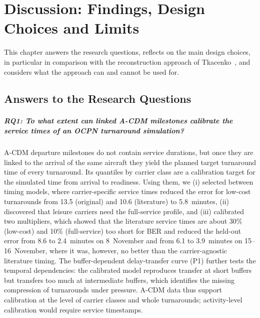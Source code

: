 \chapter{Discussion: Findings, Design Choices and Limits}
\label{ch:discussion}

This chapter answers the research questions, reflects on the main design choices, in particular in comparison with the reconstruction approach of Tkacenko~\cite{tkacenko2026}, and considers what the approach can and cannot be used for.

\section{Answers to the Research Questions}

\paragraph{RQ1: To what extent can linked A-CDM milestones calibrate the service times of an OCPN turnaround simulation?}
A-CDM departure milestones do not contain service durations, but once they are linked to the arrival of the same aircraft they yield the planned target turnaround time of every turnaround. Its quantiles by carrier class are a calibration target for the simulated time from arrival to readiness. Using them, we (i) selected between timing models, where carrier-specific service times reduced the error for low-cost turnarounds from 13.5 (original) and 10.6 (literature) to 5.8~minutes, (ii) discovered that leisure carriers need the full-service profile, and (iii) calibrated two multipliers, which showed that the literature service times are about 30\% (low-cost) and 10\% (full-service) too short for BER and reduced the held-out error from 8.6 to 2.4~minutes on 8~November and from 6.1 to 3.9~minutes on 15--16~November, where it was, however, no better than the carrier-agnostic literature timing. The buffer-dependent delay-transfer curve (P1) further tests the temporal dependencies: the calibrated model reproduces transfer at short buffers but transfers too much at intermediate buffers, which identifies the missing compression of turnarounds under pressure. A-CDM data thus support calibration at the level of carrier classes and whole turnarounds; activity-level calibration would require service timestamps.

